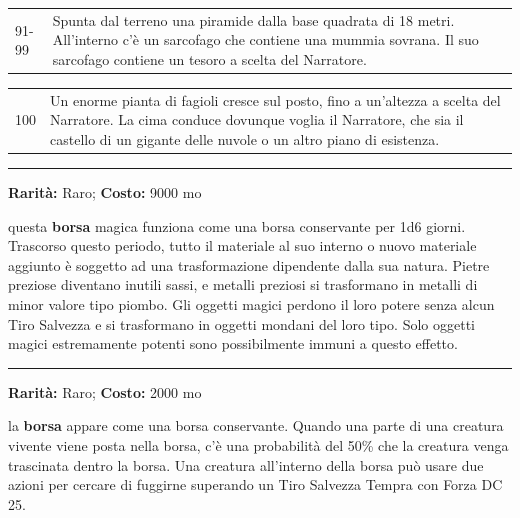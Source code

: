 \begin{multicols}{2}
\begin{tabularx}{0.50\textwidth}{lX}
91-99 &Spunta dal terreno una piramide dalla base quadrata di 18 metri. All'interno c'è un sarcofago che contiene una mummia sovrana. Il suo sarcofago contiene un tesoro a scelta del Narratore.\\
\end{tabularx}
\noindent\begin{tabularx}{0.50\textwidth}{lX}
100 &Un enorme pianta di fagioli cresce sul posto, fino a un'altezza a scelta del Narratore. La cima conduce dovunque voglia il Narratore, che sia il castello di un gigante delle nuvole o un altro piano di esistenza.
\end{tabularx}


\medskip

\smallskip\noindent\rule{\linewidth}{2pt}  \hypertarget{Borsadell'Annullamento}{}\smallskip{}\noindent\label{Borsadell'Annullamento}

\textbf{Rarità:} Raro; \textbf{Costo:} 9000 mo

questa \textbf{borsa} magica funziona come una borsa conservante per 1d6 giorni. Trascorso questo periodo, tutto il materiale al suo interno o nuovo materiale aggiunto è soggetto ad una trasformazione dipendente dalla sua natura. Pietre preziose diventano inutili sassi, e metalli preziosi si trasformano in metalli di minor valore tipo piombo. Gli oggetti magici perdono il loro potere senza alcun Tiro Salvezza e si trasformano in oggetti mondani del loro tipo. Solo oggetti magici estremamente potenti sono possibilmente immuni a questo effetto.

\smallskip\noindent\rule{\linewidth}{2pt}  \hypertarget{BorsaDivorante}{}\smallskip{}\noindent\label{BorsaDivorante}

\textbf{Rarità:} Raro; \textbf{Costo:} 2000 mo

la \textbf{borsa} appare come una borsa conservante. Quando una parte di una creatura vivente viene posta nella borsa, c'è una probabilità del 50\% che la creatura venga trascinata dentro la borsa. Una creatura all'interno della borsa può usare due azioni per cercare di fuggirne superando un Tiro Salvezza Tempra con Forza DC 25.


\end{multicols}
